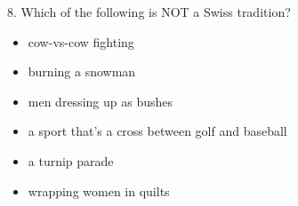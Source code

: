 \Large 8. Which of the following is NOT a Swiss tradition?   
\begin{itemize}
      \item cow-vs-cow fighting
      \item burning a snowman
      \item men dressing up as bushes
      \item a sport that's a cross between golf and baseball
      \item a turnip parade
      \item wrapping women in quilts
   \end{itemize}
